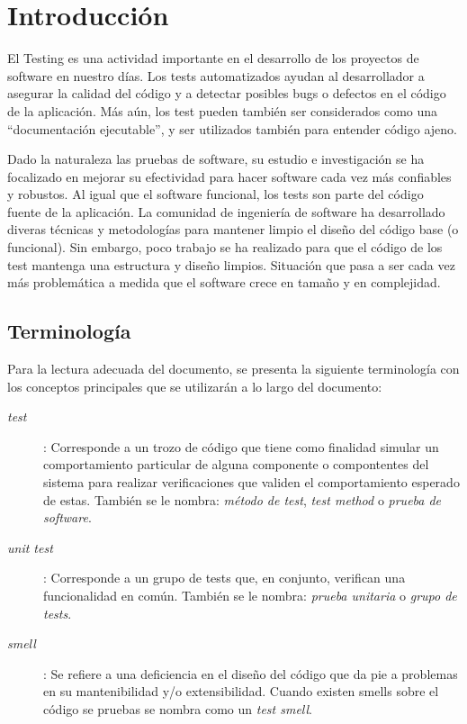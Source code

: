 \chapter{Introducción} 
\par El Testing es una actividad importante en el desarrollo de los proyectos de software en nuestro días. Los tests automatizados ayudan al desarrollador a asegurar la calidad del código y a detectar posibles bugs o defectos en el código de la aplicación. Más aún, los test pueden también ser considerados como  una ``documentación ejecutable'', y ser utilizados también para entender código ajeno.

\par Dado la naturaleza las pruebas de software, su estudio e investigación se ha focalizado en mejorar su efectividad para hacer software cada vez más confiables y robustos. Al igual que el software funcional, los tests son parte del código fuente de la aplicación. La comunidad de ingeniería de software ha desarrollado diveras técnicas y metodologías para mantener limpio el diseño del código base (o funcional). Sin embargo, poco trabajo se ha realizado para que  el código de los test mantenga una estructura y diseño limpios. Situación que pasa a ser cada vez más problemática a medida que el software crece en tamaño y en complejidad.


\section{Terminología}

\par Para la lectura adecuada del documento, se presenta la siguiente terminología con los conceptos principales que se utilizarán a lo largo del documento:

\begin{description}
\item[\emph{test}]: Corresponde a un trozo de código que tiene como finalidad simular un comportamiento particular de alguna componente o compontentes del sistema para realizar verificaciones que validen el comportamiento esperado de estas. También se le nombra: \emph{método de test}, \emph{test method} o \emph{prueba de software}.
\item[\emph{unit test}]: Corresponde a un grupo de tests que, en conjunto, verifican una funcionalidad en común. También se le nombra: \emph{prueba unitaria} o \emph{grupo de tests}.
\item[\emph{smell}]: Se refiere a una deficiencia en el diseño del código que da pie a problemas en su mantenibilidad y/o extensibilidad. Cuando existen smells sobre el código se pruebas se nombra como un \emph{test smell}.
\end{description}

